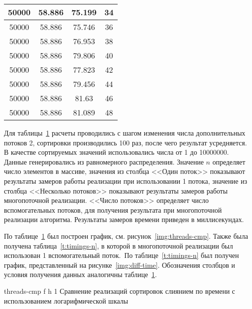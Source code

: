 \begin{table}[ht]
\begin{tabular}{|c|c|c|c|}
	50000 & 58.886                  & 75.199                            & 34          \\ \hline
	50000 & 58.886                  & 75.746                            & 36          \\ \hline
	50000 & 58.886                  & 76.953                            & 38          \\ \hline
	50000 & 58.886                  & 79.806                            & 40          \\ \hline
	50000 & 58.886                  & 77.823                            & 42          \\ \hline
	50000 & 58.886                  & 79.456                            & 44          \\ \hline
	50000 & 58.886                  & 81.63                             & 46          \\ \hline
	50000 & 58.886                  & 81.089                            & 48          \\ \hline
	\end{tabular}
	\label{t:timings}
\end{table}
Для таблицы~\ref{t:timings} расчеты проводились с шагом изменения числа дополнительных потоков 2, сортировки производились 100 раз, после чего результат усредняется. В качестве сортируемых значений использовались  числа от 1 до 10000000. Данные генерировались из равномерного распределения.
Значение $n$ определяет число элементов в массиве, значения из столбца <<Один поток>> показывают результаты замеров  работы реализации при использовании 1 потока, значение  из столбца <<Несколько потоков>> показывают результаты замеров работы многопоточной реализации. <<Число потоков>> определяет число вспомогательных потоков, для получения результата при многопоточной реализации алгоритма. Результаты замеров времени приведен в миллисекундах.


По таблице~\ref{t:timings} был построен график, см. рисунок~\ref{img:threads-cmp}.
Также была получена таблица~\ref{t:timings-n}, в которой в многопоточной реализации был использован 1 вспомогательный поток.~По таблице~\ref{t:timings-n} был получен график, представленный на рисунке~\ref{img:diff-time}. 
Обозначения столбцов и условия получения данных аналогичны таблице~\ref{t:timings}.

{threads-cmp} %
{f} %
{h} %
{1\textwidth} %
{Сравнение реализаций сортировок слиянием по времени с использованием логарифмической шкалы} %











